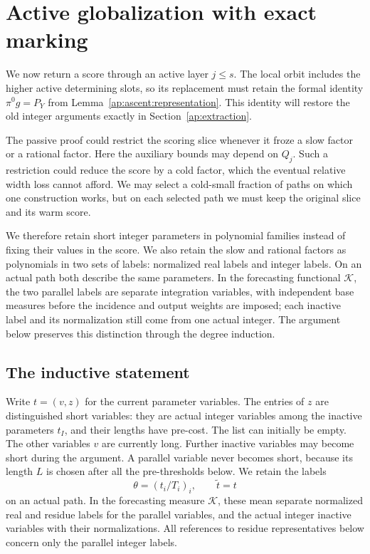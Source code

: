 \section{Active globalization with exact marking}\label{ap:active}

We now return a score through an active layer $j\leq s$.  The local
orbit includes the higher active determining slots, so its replacement must
retain the formal identity $\pi^0g=P_Y$ from
Lemma~\ref{ap:ascent:representation}.  This identity will restore the
old integer arguments exactly in Section~\ref{ap:extraction}.

The passive proof could restrict the scoring slice whenever it froze a
slow factor or a rational factor.  Here the auxiliary bounds may depend
on $Q_j$.  Such a restriction could reduce the score by a cold factor,
which the eventual relative width loss cannot afford.  We may select a
cold-small fraction of paths on which one construction works, but on
each selected path we must keep the original slice and its warm score.

We therefore retain short integer parameters in polynomial families
instead of fixing their values in the score.  We also retain the slow
and rational factors as polynomials in two sets of labels: normalized
real labels and integer labels.  On an actual path both describe the
same parameters.  In the forecasting functional $\mathcal K$, the two
parallel labels are separate integration variables, with independent
base measures before the incidence and output weights are imposed;
each inactive label and its normalization still come from one actual
integer.  The argument below
preserves this distinction through the degree induction.

\subsection{The inductive statement}

Write $t=(v,z)$ for the current parameter variables.  The entries of
$z$ are distinguished short variables: they are actual integer
variables among the inactive parameters $t_I$, and their lengths have
pre-cost.  The list can initially be empty.  The other variables $v$
are currently long.  Further inactive variables may become short
during the argument.  A parallel variable never becomes short,
because its length $L$ is chosen after all the pre-thresholds below.
We retain the labels
\[
 \theta=(t_i/T_i)_i,\qquad \widetilde t=t
\]
on an actual path.  In the forecasting measure $\mathcal K$, these
mean separate normalized real and residue labels for the parallel
variables, and the actual integer inactive variables with their
normalizations.  All references to residue representatives below
concern only the parallel integer labels.

